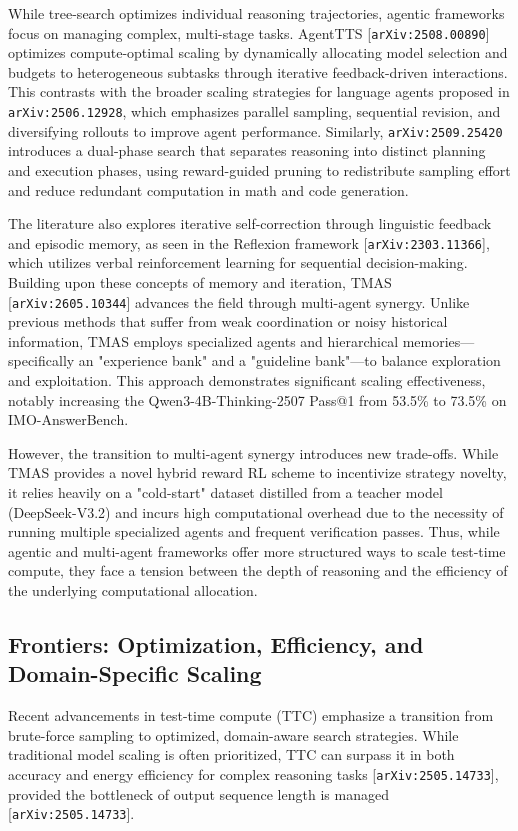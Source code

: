 \documentclass[11pt]{article}
\begin{document}
While tree-search optimizes individual reasoning trajectories, agentic frameworks focus on managing complex, multi-stage tasks. AgentTTS [\texttt{arXiv:2508.00890}] optimizes compute-optimal scaling by dynamically allocating model selection and budgets to heterogeneous subtasks through iterative feedback-driven interactions. This contrasts with the broader scaling strategies for language agents proposed in \texttt{arXiv:2506.12928}, which emphasizes parallel sampling, sequential revision, and diversifying rollouts to improve agent performance. Similarly, \texttt{arXiv:2509.25420} introduces a dual-phase search that separates reasoning into distinct planning and execution phases, using reward-guided pruning to redistribute sampling effort and reduce redundant computation in math and code generation.

The literature also explores iterative self-correction through linguistic feedback and episodic memory, as seen in the Reflexion framework [\texttt{arXiv:2303.11366}], which utilizes verbal reinforcement learning for sequential decision-making. Building upon these concepts of memory and iteration, TMAS [\texttt{arXiv:2605.10344}] advances the field through multi-agent synergy. Unlike previous methods that suffer from weak coordination or noisy historical information, TMAS employs specialized agents and hierarchical memories—specifically an "experience bank" and a "guideline bank"—to balance exploration and exploitation. This approach demonstrates significant scaling effectiveness, notably increasing the Qwen3-4B-Thinking-2507 Pass@1 from 53.5\% to 73.5\% on IMO-AnswerBench.

However, the transition to multi-agent synergy introduces new trade-offs. While TMAS provides a novel hybrid reward RL scheme to incentivize strategy novelty, it relies heavily on a "cold-start" dataset distilled from a teacher model (DeepSeek-V3.2) and incurs high computational overhead due to the necessity of running multiple specialized agents and frequent verification passes. Thus, while agentic and multi-agent frameworks offer more structured ways to scale test-time compute, they face a tension between the depth of reasoning and the efficiency of the underlying computational allocation.

\subsection{Frontiers: Optimization, Efficiency, and Domain-Specific Scaling}

Recent advancements in test-time compute (TTC) emphasize a transition from brute-force sampling to optimized, domain-aware search strategies. While traditional model scaling is often prioritized, TTC can surpass it in both accuracy and energy efficiency for complex reasoning tasks [\texttt{arXiv:2505.14733}], provided the bottleneck of output sequence length is managed [\texttt{arXiv:2505.14733}].
\end{document}
